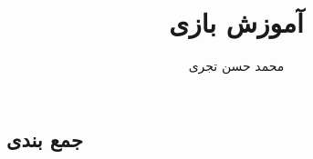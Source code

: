 \documentclass{report}
\title{{\Huge آموزش بازی \lr{dungeon crawl stone soup}}}
\author{{\LARGE محمد حسن تجری}}
\date{{\LARGE}}
\begin{document}
\maketitle

\begin{persian}

  \tableofcontents

  

  

  

  

  

  

  

  

  

  

  

  

  

  
  
  \chapter*{جمع بندی}

\end{persian}
\end{document}
